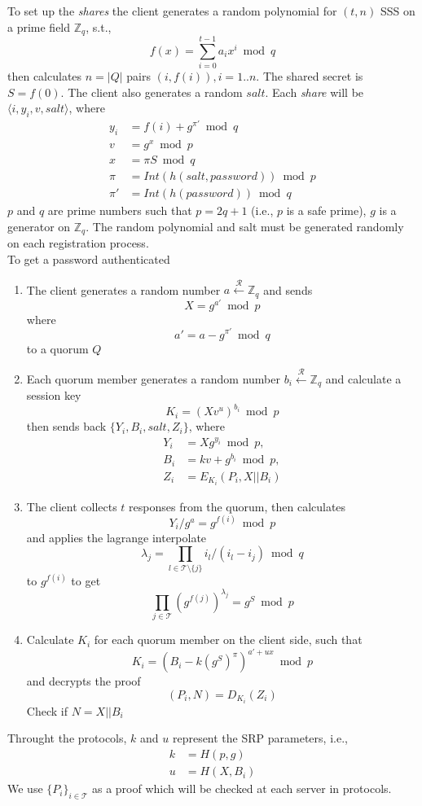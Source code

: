 \documentclass[twoside,twocolumn,10pt,fleqn]{article}
\begin{document}
To set up the {\em shares} the client generates a random polynomial
for $(t, n)$ SSS on a prime field $\mathbb{Z}_q$, s.t.,
\[
  f(x) = \sum_{i=0}^{t-1}a_ix^i \bmod q
\]
then calculates $n=|Q|$ pairs $(i,f(i)), i = 1..n$. The shared secret
is $S = f(0)$. The client also generates a random $salt$. Each {\em
share} will be $\langle i, y_i, v, salt \rangle$, where
\begin{align*}
  y_i &= f(i) + g^{\pi'} \bmod q \\
  v &= g^x \bmod p \\
  x &= \pi S \bmod q \\
  \pi &= Int(h(salt, password)) \bmod p \\
  \pi' &= Int(h(password)) \bmod q
\end{align*}
$p$ and $q$ are prime numbers such that $p = 2q + 1$ (i.e., $p$ is a
safe prime), $g$ is a generator on $\mathbb{Z}_q$. The random
polynomial and salt must be generated randomly on each registration
process.\\

To get a password authenticated
\begin{enumerate}
\item The client generates a random number
  $a \xleftarrow{\mathcal{R}} \mathbb{Z}_q$
  and sends
  \[
    X = g^{a'} \bmod p
  \]
  where
  \[
    a' = a - g^{\pi'} \bmod q
  \]
  to a quorum $Q$
\item Each quorum member generates a random number
  $b_i \xleftarrow{\mathcal{R}} \mathbb{Z}_q$
  and calculate a session key
  \[ K_i = (Xv^u)^{b_i} \bmod p \]
  then sends back $\{Y_i, B_i, salt, Z_i\}$,
  where
  \begin{align*}
    Y_i &= X g^{y_i} \bmod p, \\
    B_i &= kv + g^{b_i} \bmod p, \\
    Z_i &= E_{K_i}(P_i, X ||B_i)
  \end{align*}
\item The client collects $t$ responses from the quorum, then
  calculates
  \[
    Y_i/g^a = g^{f(i)} \bmod p
  \]
  and applies the lagrange interpolate
  \[
    \lambda_j = \prod_{l \in \mathcal{T} \setminus \{j\}}
    i_l / (i_l - i_j) \bmod q
  \]
  to $g^{f(i)}$ 
  to get
  \[
    \prod_{j \in \mathcal{T}}(g^{f(j)})^{\lambda_j} = g^S \bmod p
  \]
\item Calculate $K_i$ for each quorum member on the client side, such
  that
  \[
    K_i = (B_i - k(g^S)^{\pi})^{a'+ux} \bmod p
  \]
  and decrypts the proof
  \[
    (P_i, N) = D_{K_i}(Z_i)
  \]
  Check if $N = X||B_i$
\end{enumerate}
Throught the protocols, $k$ and $u$ represent the SRP parameters, i.e.,
\begin{align*}
  k &= H(p, g) \\
  u &= H(X, B_i)
\end{align*}
We use $\{P_i\}_{i \in \mathcal{T}}$ as a proof which will be
checked at each server in protocols.
\end{document}
